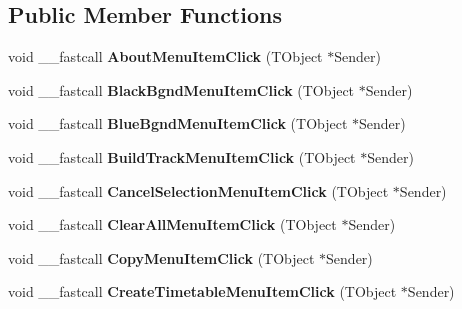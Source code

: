 \subsection*{Public Member Functions}
\begin{DoxyCompactItemize}
\item 
\mbox{\label{class_t_interface_a7ccec66d1d0a81f124397af39f43da32}} 
void \+\_\+\+\_\+fastcall {\bfseries About\+Menu\+Item\+Click} (T\+Object $\ast$Sender)
\item 
\mbox{\label{class_t_interface_a237c151513ca8adca6cd1006cc2fc66f}} 
void \+\_\+\+\_\+fastcall {\bfseries Black\+Bgnd\+Menu\+Item\+Click} (T\+Object $\ast$Sender)
\item 
\mbox{\label{class_t_interface_a24d79aa4745e495daa07bb5ce412e75f}} 
void \+\_\+\+\_\+fastcall {\bfseries Blue\+Bgnd\+Menu\+Item\+Click} (T\+Object $\ast$Sender)
\item 
\mbox{\label{class_t_interface_ab1799665ee1e4212186f80ab49acf1e1}} 
void \+\_\+\+\_\+fastcall {\bfseries Build\+Track\+Menu\+Item\+Click} (T\+Object $\ast$Sender)
\item 
\mbox{\label{class_t_interface_a2fb2cd7dbddb7fa689ea994e9ffc10ff}} 
void \+\_\+\+\_\+fastcall {\bfseries Cancel\+Selection\+Menu\+Item\+Click} (T\+Object $\ast$Sender)
\item 
\mbox{\label{class_t_interface_a928eba983ac5132e1ae7799f8330451e}} 
void \+\_\+\+\_\+fastcall {\bfseries Clear\+All\+Menu\+Item\+Click} (T\+Object $\ast$Sender)
\item 
\mbox{\label{class_t_interface_a424a7eb780461c1acb396feb21f52062}} 
void \+\_\+\+\_\+fastcall {\bfseries Copy\+Menu\+Item\+Click} (T\+Object $\ast$Sender)
\item 
\mbox{\label{class_t_interface_a1c8fab7fa2f1be662f2d7418e95e3a63}} 
void \+\_\+\+\_\+fastcall {\bfseries Create\+Timetable\+Menu\+Item\+Click} (T\+Object $\ast$Sender)
\item 
\mbox{\label{class_t_interface_ae6e977c9dfdfbde9924ceefd19d7d0d3}} 

\end{DoxyCompactItemize}
